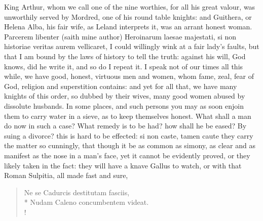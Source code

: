 King Arthur, whom we call one of the nine worthies, for all his
great valour, was unworthily served by Mordred, one of his round table
knights: and Guithera, or Helena Alba, his fair wife, as Leland
interprets it, was an arrant honest woman. Parcerem libenter (saith
mine author) Heroinarum laesae majestati, si non historiae
veritas aurem vellicaret, I could willingly wink at a fair lady's
faults, but that I am bound by the laws of history to tell the truth:
against his will, God knows, did he write it, and so do I repeat it. I
speak not of our times all this while, we have good, honest, virtuous
men and women, whom fame, zeal, fear of God, religion and superstition
contains: and yet for all that, we have many knights of this order, so
dubbed by their wives, many good women abused by dissolute husbands. In
some places, and such persons you may as soon enjoin them to carry
water in a sieve, as to keep themselves honest. What shall a man do now
in such a case? What remedy is to be had? how shall he be eased? By
suing a divorce? this is hard to be effected: si non caste, tamen caute
they carry the matter so cunningly, that though it be as common as
simony, as clear and as manifest as the nose in a man's face, yet it
cannot be evidently proved, or they likely taken in the fact: they will
have a knave Gallus to watch, or with that Roman Sulpitia, all
made fast and sure,
%
\begin{latin}
\begin{verse}%
Ne se Cadurcis destitutam fasciis,\\*
Nudam Caleno concumbentem videat.\\!
\end{verse}%
\end{latin}

